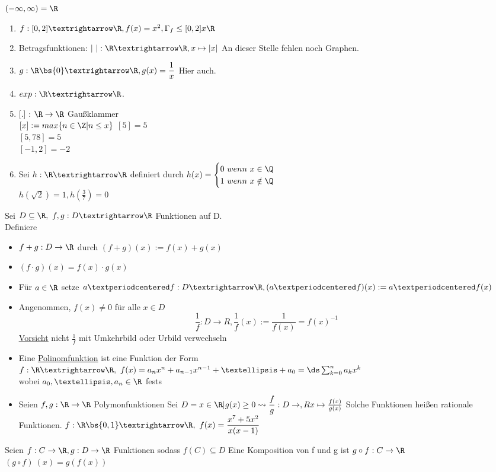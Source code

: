 $(- \infty, \infty) = \R$\\
%
\begin{enumerate}
\item{$f:[0,2]→\R, f(x)=x^2, \Gamma_f \leq [0,2] x\R$}
\item{Betragsfunktionen: $|\ |: \R→\R, x\mapsto|x|$
}
An dieser Stelle fehlen noch Graphen.
\item{$g:\R\bs\{0\}→\R, g(x)=\dfrac{1}{x}$
Hier auch.
}
\item{$exp:\R→\R$.}
\item{[.] : $\R \to \R$ Gaußklammer\\
$[x] := max\{n \in \Z | n \leq x \}$
\bsp
$[5] = 5$\\
$[5,78] = 5$\\
$[-1,2] = -2$}
\item{Sei $h:\R→\R$ definiert durch $h(x)=\begin{cases}0\ wenn\ x\in\Q\\ 1\ wenn\ x\notin\Q\end{cases}$\\
$h(\sqrt{2}) = 1, h (\frac{3}{7}) = 0$}
\end{enumerate}
%
Sei $D \subseteq \R , \ f,g: D→\R$ Funktionen auf D.\\
Definiere
\begin{itemize}
\item{$f+g: D \to \R$ durch $(f + g)(x) := f(x) + g(x)$}
\item{$(f \cdot  g) (x) = f(x) \cdot g(x)$}
\item{Für $a\in\R$ setze $a·f: D→\R, (a·f)(x):=a·f(x)$}
\item{Angenommen, $f(x) \neq 0$ für alle $x \in D$ \\
$$\frac{1}{f}: D \to R, \frac{1}{f}(x) := \frac{1}{f(x)} = f(x)^{-1}$$
\underline{\underline{Vorsicht}} nicht $\frac{1}{f}$ mit Umkehrbild oder Urbild verwechseln}
\end{itemize}
%
\begin{itemize}
\item{Eine \underline{Polinomfunktion} ist eine Funktion der Form\\
$f: \R → \R,\ f(x) = a_n x^n+a_{n-1}x^{n-1}+…+a_0=\ds\sum_{k=0}^n a_k x^k $\\
wobei $a_0,…,a_n \in \R$ fest}s
%
\item{Seien $f, g : \R \to \R $ Polymonfunktionen
Sei $D = {x \in \R | g(x) \geq 0}\leadsto \dfrac{f}{g} : D \to , Rx \mapsto \frac{f(x)}{g(x)}$
Solche Funktionen heißen rationale Funktionen.
\bsp
$f:\R\bs\{0,1\}→\R, \ f(x)=\dfrac{x^7+5x^2}{x(x-1)}$}
\end{itemize}
Seien $f: C \to \R, g: D \to \R$ Funktionen sodass $f(C) \subseteq D$
Eine Komposition von f und g ist 
%
$g \circ f : C \to \R$\\
$(g \circ f) \ (x) = g(f(x))$
